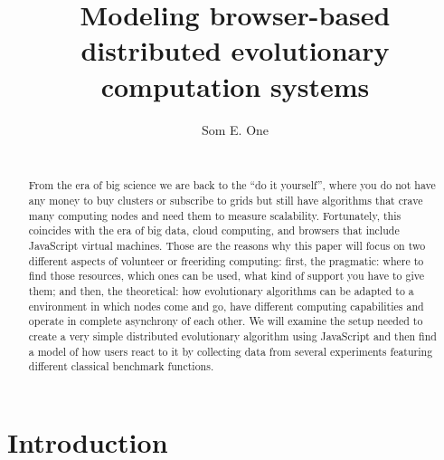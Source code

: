 \documentclass{sig-alternate}
\begin{document}
\title{Modeling browser-based distributed evolutionary computation systems} 

%
\author{
%
%
\alignauthor
Som E. One\\
       \\
}


\maketitle

\begin{abstract}
From the era of big science we are back to the ``do it yourself'', where
you do not have any money to buy clusters or subscribe to grids but
still have algorithms that crave many computing nodes and need them to
measure scalability. Fortunately, this coincides with the era of big
data, cloud computing, and browsers that include JavaScript virtual
machines. Those are the reasons why this paper will focus on two
different aspects of volunteer or freeriding computing: first, the
pragmatic: where to find those resources, which ones can be used, what
kind of support you have to give them; and then, the theoretical: how
evolutionary algorithms can be adapted to a environment in which nodes
come and go, have different computing capabilities and operate in
complete asynchrony of each other. We will examine the setup needed to
create a very simple distributed evolutionary algorithm using
JavaScript and then find a model of how users react to it by
collecting data from several experiments featuring different classical
benchmark functions. 
\end{abstract}


\section{Introduction}
\end{document}
